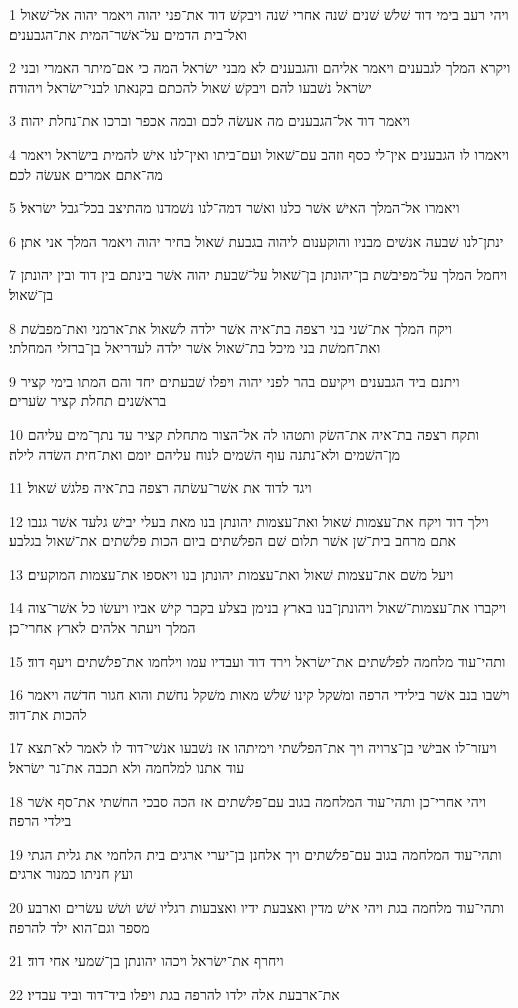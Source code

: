 \par 1 ויהי רעב בימי דוד שׁלשׁ שׁנים שׁנה אחרי שׁנה ויבקשׁ דוד את־פני יהוה ויאמר יהוה אל־שׁאול ואל־בית הדמים על־אשׁר־המית את־הגבענים׃
\par 2 ויקרא המלך לגבענים ויאמר אליהם והגבענים לא מבני ישׂראל המה כי אם־מיתר האמרי ובני ישׂראל נשׁבעו להם ויבקשׁ שׁאול להכתם בקנאתו לבני־ישׂראל ויהודה׃
\par 3 ויאמר דוד אל־הגבענים מה אעשׂה לכם ובמה אכפר וברכו את־נחלת יהוה׃
\par 4 ויאמרו לו הגבענים אין־לי כסף וזהב עם־שׁאול ועם־ביתו ואין־לנו אישׁ להמית בישׂראל ויאמר מה־אתם אמרים אעשׂה לכם׃
\par 5 ויאמרו אל־המלך האישׁ אשׁר כלנו ואשׁר דמה־לנו נשׁמדנו מהתיצב בכל־גבל ישׂראל׃
\par 6 ינתן־לנו שׁבעה אנשׁים מבניו והוקענום ליהוה בגבעת שׁאול בחיר יהוה ויאמר המלך אני אתן׃
\par 7 ויחמל המלך על־מפיבשׁת בן־יהונתן בן־שׁאול על־שׁבעת יהוה אשׁר בינתם בין דוד ובין יהונתן בן־שׁאול׃
\par 8 ויקח המלך את־שׁני בני רצפה בת־איה אשׁר ילדה לשׁאול את־ארמני ואת־מפבשׁת ואת־חמשׁת בני מיכל בת־שׁאול אשׁר ילדה לעדריאל בן־ברזלי המחלתי׃
\par 9 ויתנם ביד הגבענים ויקיעם בהר לפני יהוה ויפלו שׁבעתים יחד והם המתו בימי קציר בראשׁנים תחלת קציר שׂערים׃
\par 10 ותקח רצפה בת־איה את־השׂק ותטהו לה אל־הצור מתחלת קציר עד נתך־מים עליהם מן־השׁמים ולא־נתנה עוף השׁמים לנוח עליהם יומם ואת־חית השׂדה לילה׃
\par 11 ויגד לדוד את אשׁר־עשׂתה רצפה בת־איה פלגשׁ שׁאול׃
\par 12 וילך דוד ויקח את־עצמות שׁאול ואת־עצמות יהונתן בנו מאת בעלי יבישׁ גלעד אשׁר גנבו אתם מרחב בית־שׁן אשׁר תלום שׁם הפלשׁתים ביום הכות פלשׁתים את־שׁאול בגלבע׃
\par 13 ויעל משׁם את־עצמות שׁאול ואת־עצמות יהונתן בנו ויאספו את־עצמות המוקעים׃
\par 14 ויקברו את־עצמות־שׁאול ויהונתן־בנו בארץ בנימן בצלע בקבר קישׁ אביו ויעשׂו כל אשׁר־צוה המלך ויעתר אלהים לארץ אחרי־כן׃
\par 15 ותהי־עוד מלחמה לפלשׁתים את־ישׂראל וירד דוד ועבדיו עמו וילחמו את־פלשׁתים ויעף דוד׃
\par 16 וישׁבו בנב אשׁר בילידי הרפה ומשׁקל קינו שׁלשׁ מאות משׁקל נחשׁת והוא חגור חדשׁה ויאמר להכות את־דוד׃
\par 17 ויעזר־לו אבישׁי בן־צרויה ויך את־הפלשׁתי וימיתהו אז נשׁבעו אנשׁי־דוד לו לאמר לא־תצא עוד אתנו למלחמה ולא תכבה את־נר ישׂראל׃
\par 18 ויהי אחרי־כן ותהי־עוד המלחמה בגוב עם־פלשׁתים אז הכה סבכי החשׁתי את־סף אשׁר בילדי הרפה׃
\par 19 ותהי־עוד המלחמה בגוב עם־פלשׁתים ויך אלחנן בן־יערי ארגים בית הלחמי את גלית הגתי ועץ חניתו כמנור ארגים׃
\par 20 ותהי־עוד מלחמה בגת ויהי אישׁ מדין ואצבעת ידיו ואצבעות רגליו שׁשׁ ושׁשׁ עשׂרים וארבע מספר וגם־הוא ילד להרפה׃
\par 21 ויחרף את־ישׂראל ויכהו יהונתן בן־שׁמעי אחי דוד׃
\par 22 את־ארבעת אלה ילדו להרפה בגת ויפלו ביד־דוד וביד עבדיו׃

